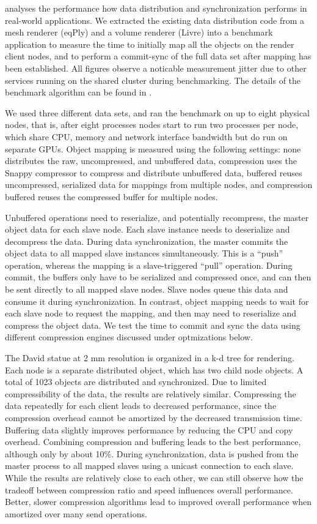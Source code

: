  analyses the performance how data distribution and
synchronization performs in real-world applications. We extracted the existing
data distribution code from a mesh renderer (eqPly) and a volume renderer
(Livre) into a benchmark application to measure the time to initially map all
the objects on the render client nodes, and to perform a commit-sync of the
full data set after mapping has been established. All figures observe a
noticable measurement jitter due to other services running on the shared
cluster during benchmarking. The details of the benchmark algorithm can be
found in \cite{ESP:18}.

We used three different data sets, and ran the benchmark on up to eight
physical nodes, that is, after eight processes nodes start to run two processes
per node, which share CPU, memory and network interface bandwidth but do run on
separate GPUs. Object mapping is measured using the following settings:
\textsf{none} distributes the raw, uncompressed, and unbuffered data,
\textsf{compression} uses the Snappy compressor to compress and distribute
unbuffered data, \textsf{buffered} reuses uncompressed, serialized data for
mappings from multiple nodes, and \textsf{compression buffered} reuses the
compressed buffer for multiple nodes.

Unbuffered operations need to reserialize, and potentially recompress, the
master object data for each slave node. Each slave instance needs to
deserialize and decompress the data. During data synchronization, the master
commits the object data to all mapped slave instances simultaneously. This is a
“push” operation, whereas the mapping is a slave-triggered “pull” operation.
During commit, the buffers only have to be serialized and compressed once, and
can then be sent directly to all mapped slave nodes. Slave nodes queue this
data and consume it during synchronization. In contrast, object mapping needs
to wait for each slave node to request the mapping, and then may need to
reserialize and compress the object data. We test the time to commit and sync
the data using different compression engines discussed under optmizations
below.

The David statue at 2 mm resolution is organized in a k-d tree for rendering.
Each node is a separate distributed object, which has two child node objects. A
total of 1023 objects are distributed and synchronized. Due to limited
compressibility of the data, the results are relatively similar. Compressing
the data repeatedly for each client leads to decreased performance, since the
compression overhead cannot be amortized by the decreased transmission time.
Buffering data slightly improves performance by reducing the CPU and copy
overhead. Combining compression and buffering leads to the best performance,
although only by about 10\%. During synchronization, data is pushed from the
master process to all mapped slaves using a unicast connection to each slave.
While the results are relatively close to each other, we can still observe how
the tradeoff between compression ratio and speed influences overall
performance. Better, slower compression algorithms lead to improved overall
performance when amortized over many send operations.

